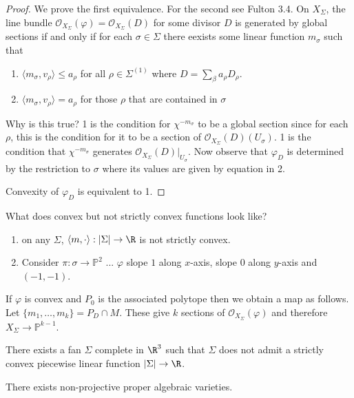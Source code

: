 \documentclass[a4paper]{article}
\renewcommand*{\P}{\mathbb{P}}
\newcommand{\sh}[1]{\mathcal{#1}} %
\begin{document}
\begin{proof}
  We prove the first equivalence. For the second see Fulton 3.4. On \(X_\Sigma\), the line bundle \(\sh O_{X_\Sigma}(\varphi) = \sh O_{X_\Sigma}(D)\) for some divisor \(D\) is generated by global sections if and only if for each \(\sigma \in \Sigma\) there eexists some linear function \(m_\sigma\) such that
  \begin{enumerate}
  \item \(\langle m_\sigma, v_\rho \rangle \leq a_\rho\) for all \(\rho \in \Sigma^{(1)}\) where \(D = \sum_\beta a_\rho D_\rho\).
  \item \(\langle m_\sigma, v_\rho \rangle = a_\rho\) for those \(\rho\) that are contained in \(\sigma\)
  \end{enumerate}
  Why is this true? 1 is the condition for \(\chi^{-m_\sigma}\) to be a global section since for each \(\rho\), this is the condition for it to be a section of \(\sh O_{X_\Sigma}(D)(U_\sigma)\). 1 is the condition that \(\chi^{-m_\sigma}\) generates \(\sh O_{X_\Sigma}(D)|_{U_\sigma}\). Now observe that \(\varphi_D\) is determined by the restriction to \(\sigma\) where its values are given by equation in 2.

  Convexity of \(\varphi_D\) is equivalent to 1.
\end{proof}

What does convex but not strictly convex functions look like?
\begin{enumerate}
\item on any \(\Sigma\), \(\langle m, \cdot\rangle: |\Sigma| \to \R\) is not strictly convex.
\item Consider \(\pi: \sigma \to \P^2\) ... \(\varphi\) slope \(1\) along \(x\)-axis, slope \(0\) along \(y\)-axis and \((-1, -1)\).
\end{enumerate}

If \(\varphi\) is convex and \(P_0\) is the associated polytope then we obtain a map as follows. Let \(\{m_1, \dots, m_k\} = P_D \cap M\). These give \(k\) sections of \(\sh O_{X_\Sigma}(\varphi)\) and therefore \(X_\Sigma \to \P^{k - 1}\).

\begin{theorem}
  \label{thm:fan not admitting strictly convex function}
  There exists a fan \(\Sigma\) complete in \(\R^3\) such that \(\Sigma\) does not admit a strictly convex piecewise linear function \(|\Sigma| \to \R\).
\end{theorem}

\begin{corollary}
  There exists non-projective proper algebraic varieties.
\end{corollary}
\end{document}

